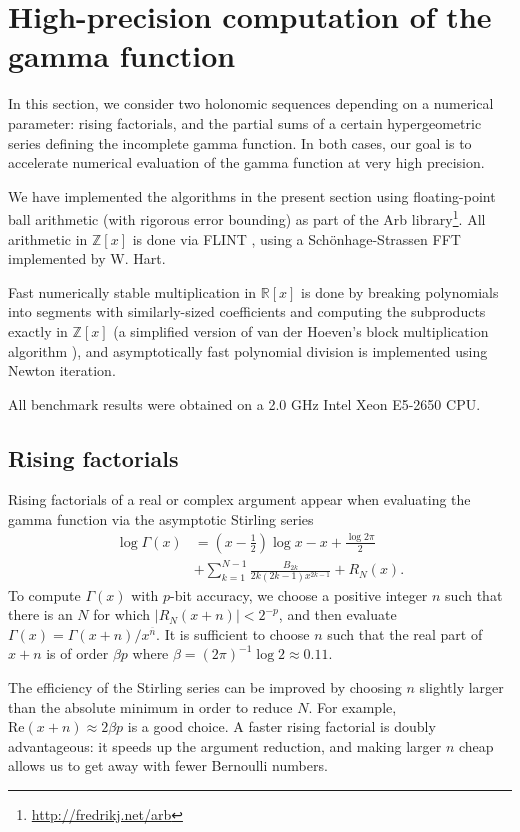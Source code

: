 \documentclass{sig-alternate}
\begin{document}
\section{High-precision computation of the gamma function} \label{sect:casestudy}

In this section, we consider two holonomic sequences depending
on a numerical parameter: rising factorials, and the partial
sums of a certain hypergeometric series defining the incomplete
gamma function. In both cases, our goal is to accelerate numerical
evaluation of the gamma function at very high precision.

We have implemented the algorithms in the present section using
floating-point ball arithmetic (with rigorous error bounding)
as part of the Arb library\footnote{\url{http://fredrikj.net/arb}}.
All arithmetic in $\mathbb{Z}[x]$ is done via FLINT \cite{Hart2010},
using a Sch\"{o}nhage-Strassen FFT implemented by W. Hart.

Fast numerically stable multiplication in $\mathbb{R}[x]$ is
done by breaking polynomials into segments with
similarly-sized coefficients and computing the subproducts
exactly in $\mathbb{Z}[x]$ (a simplified version of
van der Hoeven's block multiplication algorithm
\cite{vdH:stablemult}), and asymptotically fast
polynomial division is implemented using Newton iteration.

All benchmark results were obtained on a 2.0 GHz Intel Xeon E5-2650 CPU.

\subsection{Rising factorials} \label{sect:rising}

Rising factorials of a real or complex argument appear when
evaluating the gamma function via the asymptotic Stirling series
\begin{align*}
\log \Gamma(x) & = \left(x-\frac{1}{2}\right) \log x - x + \frac{\log 2 \pi}{2} \\
& + \sum_{k=1}^{N-1} \frac{B_{2k}}{2k(2k-1)x^{2k-1}} + R_N(x).
\end{align*}
To compute $\Gamma(x)$ with $p$-bit accuracy, we choose a
positive integer $n$ such that there is an $N$ for which
$|R_N(x+n)| < 2^{-p}$, and then evaluate
${\Gamma(x) = \Gamma(x+n) / x^{\overline{n}}}$.
It is sufficient to choose $n$ such that the
real part of $x + n$ is of order $\beta p$ where
$\beta = (2 \pi)^{-1} \log 2 \approx 0.11$.

The efficiency of the Stirling series can be improved
by choosing $n$ slightly larger than the absolute minimum
in order to reduce $N$. For example,
$\mathrm{Re}(x+n) \approx 2 \beta p$ is a good choice.
A faster rising factorial is doubly advantageous: it
speeds up the argument reduction, and making larger $n$ cheap
allows us to get away with fewer Bernoulli numbers.
\end{document}
